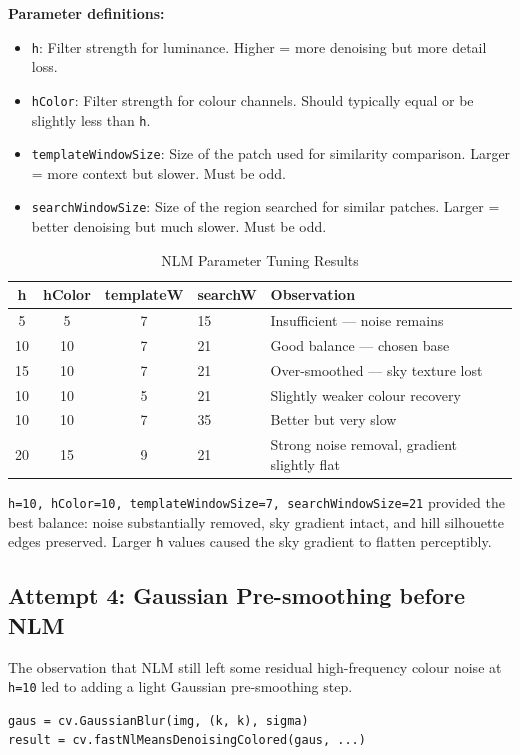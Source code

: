\documentclass[journal]{IEEEtran}
\begin{document}
\textbf{Parameter definitions:}
\begin{itemize}
    \item \texttt{h}: Filter strength for luminance. Higher = more denoising but 
    more detail loss.
    \item \texttt{hColor}: Filter strength for colour channels. Should typically 
    equal or be slightly less than \texttt{h}.
    \item \texttt{templateWindowSize}: Size of the patch used for similarity 
    comparison. Larger = more context but slower. Must be odd.
    \item \texttt{searchWindowSize}: Size of the region searched for similar 
    patches. Larger = better denoising but much slower. Must be odd.
\end{itemize}

\begin{table}[h]
\centering
\caption{NLM Parameter Tuning Results}
\begin{tabular}{@{}cccll@{}}
\toprule
h & hColor & templateW & searchW & Observation \\
\midrule
5 & 5 & 7 & 15 & Insufficient — noise remains \\
10 & 10 & 7 & 21 & Good balance — chosen base \\
15 & 10 & 7 & 21 & Over-smoothed — sky texture lost \\
10 & 10 & 5 & 21 & Slightly weaker colour recovery \\
10 & 10 & 7 & 35 & Better but very slow \\
20 & 15 & 9 & 21 & Strong noise removal, gradient slightly flat \\
\bottomrule
\end{tabular}
\end{table}

\texttt{h=10, hColor=10, templateWindowSize=7, searchWindowSize=21} provided the 
best balance: noise substantially removed, sky gradient intact, and hill silhouette 
edges preserved. Larger \texttt{h} values caused the sky gradient to flatten 
perceptibly.

\subsection{Attempt 4: Gaussian Pre-smoothing before NLM}
The observation that NLM still left some residual high-frequency colour noise 
at \texttt{h=10} led to adding a light Gaussian pre-smoothing step.

\begin{lstlisting}
gaus = cv.GaussianBlur(img, (k, k), sigma)
result = cv.fastNlMeansDenoisingColored(gaus, ...)
\end{lstlisting}
\end{document}
